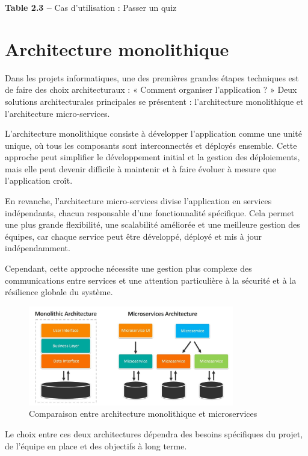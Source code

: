 \documentclass[12pt,a4paper]{report}
\begin{document}
\begin{center}
\textbf{Table 2.3 –} Cas d'utilisation : Passer un quiz
\end{center}

\section{Architecture monolithique}

Dans les projets informatiques, une des premières grandes étapes techniques est de faire des choix architecturaux : « Comment organiser l'application ? » Deux solutions architecturales principales se présentent : l'architecture monolithique et l'architecture micro-services.

L'architecture monolithique consiste à développer l'application comme une unité unique, où tous les composants sont interconnectés et déployés ensemble. Cette approche peut simplifier le développement initial et la gestion des déploiements, mais elle peut devenir difficile à maintenir et à faire évoluer à mesure que l'application croît.

En revanche, l'architecture micro-services divise l'application en services indépendants, chacun responsable d'une fonctionnalité spécifique. Cela permet une plus grande flexibilité, une scalabilité améliorée et une meilleure gestion des équipes, car chaque service peut être développé, déployé et mis à jour indépendamment.

Cependant, cette approche nécessite une gestion plus complexe des communications entre services et une attention particulière à la sécurité et à la résilience globale du système.

\begin{figure}[H]
\centering
\includegraphics[width=0.8\textwidth]{latex_media/media/image15.jpeg}
\caption{Comparaison entre architecture monolithique et microservices}
\label{fig:comparaison-architectures}
\end{figure}

Le choix entre ces deux architectures dépendra des besoins spécifiques du projet, de l'équipe en place et des objectifs à long terme.
\end{document}
